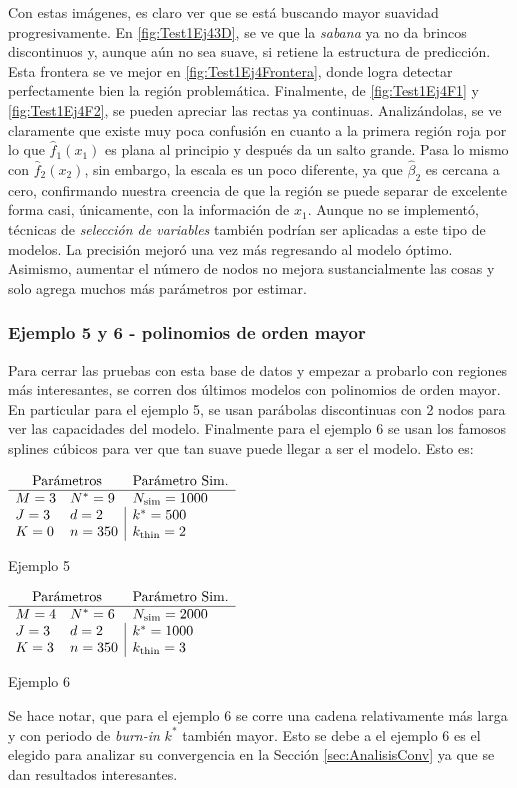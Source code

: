 \documentclass[../Main/Main.tex]{subfiles}
\begin{document}
Con estas imágenes, es claro ver que se está buscando mayor suavidad progresivamente. En \ref{fig:Test1Ej43D}, se ve que la \textit{sabana} ya no da brincos discontinuos y, aunque aún no sea suave, si retiene la estructura de predicción. Esta frontera se ve mejor en \ref{fig:Test1Ej4Frontera}, donde logra detectar perfectamente bien la región problemática. Finalmente, de \ref{fig:Test1Ej4F1} y \ref{fig:Test1Ej4F2}, se pueden apreciar las rectas ya continuas. Analizándolas, se ve claramente que existe muy poca confusión en cuanto a la primera región roja por lo que $\hat{f}_1(x_1)$ es plana al principio y después da un salto grande. Pasa lo mismo con $\hat{f}_2(x_2)$, sin embargo, la escala es un poco diferente, ya que $\hat{\beta}_2$ es cercana a cero, confirmando nuestra creencia de que la región se puede separar de excelente forma casi, únicamente, con la información de $x_1$. Aunque no se implementó, técnicas de \textit{selección de variables} también podrían ser aplicadas a este tipo de modelos. La precisión mejoró una vez más regresando al modelo óptimo. Asimismo, aumentar el número de nodos no mejora sustancialmente las cosas y solo agrega muchos más parámetros por estimar. 

\subsubsection*{Ejemplo 5 y 6 - polinomios de orden mayor} \label{sec:Test1Ej6}
Para cerrar las pruebas con esta base de datos y empezar a probarlo con regiones más interesantes, se corren dos últimos modelos con polinomios de orden mayor. En particular para el ejemplo 5, se usan parábolas discontinuas con 2 nodos para ver las capacidades del modelo. Finalmente para el ejemplo 6 se usan los famosos splines cúbicos para ver que tan suave puede llegar a ser el modelo. Esto es:
\begin{table}[H]
	\begin{subtable}{0.45\textwidth}
	\centering
	$\paramsmod{3}{3}{0}{9}{2}{350}{1000}{500}{2}$
	\caption*{Ejemplo 5}
	\end{subtable}
	\quad
	\begin{subtable}{0.45\textwidth}
	\centering
	$\paramsmod{4}{3}{3}{6}{2}{350}{2000}{1000}{3}$	
	\caption*{Ejemplo 6}
	\label{ej:6}
	\end{subtable}
\end{table}
Se hace notar, que para el ejemplo 6 se corre una cadena relativamente más larga y con periodo de \textit{burn-in} $k^*$ también mayor. Esto se debe a el ejemplo 6 es el elegido para analizar su convergencia en la Sección \ref{sec:AnalisisConv} ya que se dan resultados interesantes.\\
\end{document}
